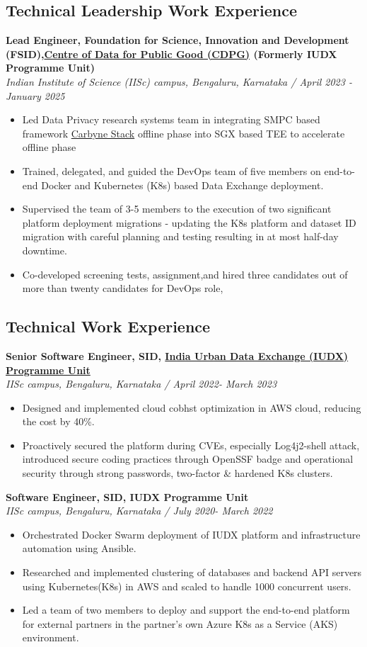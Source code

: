 \documentclass[a4paper,11pt]{article}
\begin{document}
\subsection*{Technical Leadership Work Experience} 
\textbf{Lead Engineer, Foundation for Science, Innovation and Development (FSID),\href{https://dataforpublicgood.org.in/}{Centre of Data for Public Good (CDPG)} (Formerly IUDX Programme Unit)} \\
\textit{Indian Institute of Science (IISc) campus, Bengaluru, Karnataka / April 2023 - January 2025} 
\begin{itemize}
\item Led Data Privacy research systems team in integrating SMPC based framework \href{https://carbynestack.io/}{Carbyne Stack} offline phase into SGX based TEE to accelerate offline phase 
\item Trained, delegated, and guided the DevOps team of five members on end-to-end Docker and Kubernetes (K8s) based  Data Exchange deployment.

\item Supervised the team of 3-5 members to the execution of two significant platform deployment migrations - updating the K8s platform and dataset ID migration with careful planning and testing resulting in at most half-day downtime.
\item Co-developed screening tests, assignment,and hired three candidates out of more than twenty candidates for DevOps role, 
\end{itemize}
\subsection*{Technical Work Experience}
\textbf{Senior Software Engineer, SID,  \href{https://iudx.org.in}{India Urban Data Exchange (IUDX) Programme Unit}} \\
\textit{IISc campus, Bengaluru, Karnataka / April 2022- March 2023} 
\begin{itemize}
\item Designed and implemented cloud cobhst optimization in AWS cloud, reducing the cost by 40\%.
\item  Proactively secured the platform during CVEs, especially Log4j2-shell attack, introduced secure coding practices through OpenSSF badge and operational security through strong passwords, two-factor \& hardened K8s clusters.
\end{itemize}
\textbf{Software Engineer, SID,  IUDX Programme Unit} \\
\textit{IISc campus, Bengaluru, Karnataka / July 2020- March 2022} 
\begin{itemize} 
\item Orchestrated Docker Swarm deployment of IUDX platform and infrastructure automation using Ansible.  
\item Researched and implemented clustering of databases and backend API servers using Kubernetes(K8s) in AWS and scaled to handle 1000 concurrent users.
\item Led a team of two members to deploy and support the end-to-end platform for external partners in the partner's own Azure K8s as a Service (AKS) environment. 
\end{itemize}
\end{document}
